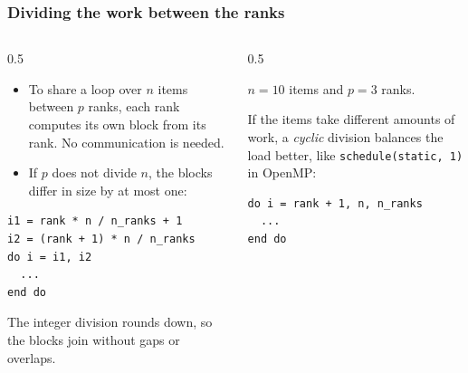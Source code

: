 \begin{frame}[fragile]
  \frametitle{Dividing the work between the ranks}
  \begin{columns}[T]
    \begin{column}{0.5\textwidth}
      \begin{itemize}
        \item To share a loop over $n$ items between $p$ ranks, each rank computes its own block from its rank. No communication is needed.
        \item If $p$ does not divide $n$, the blocks differ in size by at most one:
      \end{itemize}
\begin{lstlisting}
i1 = rank * n / n_ranks + 1
i2 = (rank + 1) * n / n_ranks
do i = i1, i2
  ...
end do
\end{lstlisting}
      The integer division rounds down, so the blocks join without gaps or overlaps.
    \end{column}

    \begin{column}{0.5\textwidth}
      \centering

      \vspace*{1mm}
      \footnotesize $n = 10$ items and $p = 3$ ranks.

      \vspace*{3mm}
      \raggedright
      \normalsize
      If the items take different amounts of work, a \emph{cyclic} division balances the load better, like \texttt{schedule(static, 1)} in OpenMP:
\begin{lstlisting}
do i = rank + 1, n, n_ranks
  ...
end do
\end{lstlisting}
    \end{column}
  \end{columns}
\end{frame}


